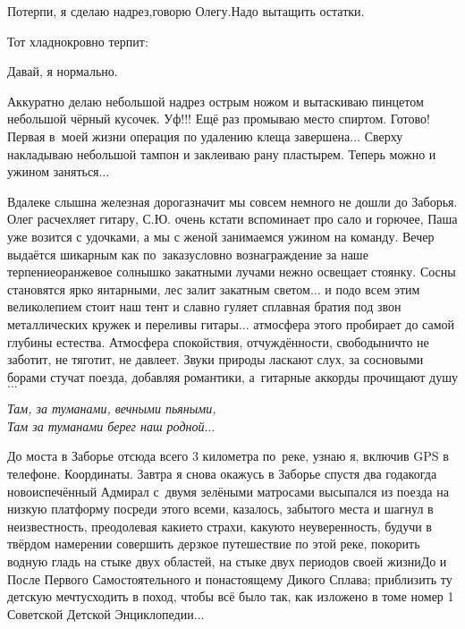\diagdash Потерпи, я сделаю надрез,\mdash говорю Олегу.\mdash Надо вытащить остатки.

Тот хладнокровно терпит:

\diagdash Давай, я нормально.
 
Аккуратно делаю небольшой надрез острым ножом и вытаскиваю пинцетом небольшой чёрный кусочек. Уф!!! Ещё раз промываю место спиртом. Готово! Первая в~моей жизни операция по удалению клеща завершена$\ldots$ Сверху накладываю небольшой тампон и заклеиваю рану пластырем. Теперь можно и ужином заняться$\ldots$

Вдалеке слышна железная дорога\mdash значит мы совсем немного не дошли до Заборья. Олег расчехляет гитару, С.Ю. очень кстати вспоминает про сало и горючее, Паша уже возится с удочками, а мы с женой занимаемся ужином на команду. Вечер выдаётся шикарным как по~заказу\mdash словно вознаграждение за наше терпение\mdash оранжевое солнышко закатными лучами нежно освещает стоянку. Сосны становятся ярко янтарными, лес залит закатным светом$\ldots$ и подо всем этим великолепием стоит наш тент и славно гуляет сплавная братия под звон металлических кружек и переливы гитары$\ldots$ атмосфера этого пробирает до самой глубины естества. Атмосфера спокойствия, отчуждённости, свободы\mdash ничто не заботит, не тяготит, не давлеет. Звуки природы ласкают слух, за сосновыми борами стучат поезда, добавляя романтики, а~гитарные аккорды прочищают душу$\ldots$ 

\vspace{0.3cm}
\noindent\textit{%
	\hspace*{1.9cm}Там, за туманами, вечными пьяными,\\
	\hspace*{1.9cm}Там за туманами берег наш родной$\ldots$ 
}
\vspace{0.3cm}

До моста в Заборье отсюда всего 3 километра по~реке, узнаю я, включив GPS в телефоне. Координаты\mdash \CoordsLidSeventeenNearZaborie. Завтра я снова окажусь в Заборье спустя два года\mdash когда новоиспечённый Адмирал с~двумя зелёными матросами высыпался из поезда на низкую платформу посреди этого всеми, казалось, забытого места и шагнул в неизвестность, преодолевая какие\sdash то страхи, какую\sdash то неуверенность, будучи в твёрдом намерении совершить дерзкое путешествие по этой реке, покорить водную гладь на стыке двух областей, на стыке двух периодов своей жизни\mdash До и После Первого Самостоятельного и по\sdash настоящему Дикого Сплава; приблизить ту детскую мечту\mdash сходить в поход, чтобы всё было так, как изложено в томе номер 1 Советской Детской Энциклопедии$\ldots$ 

